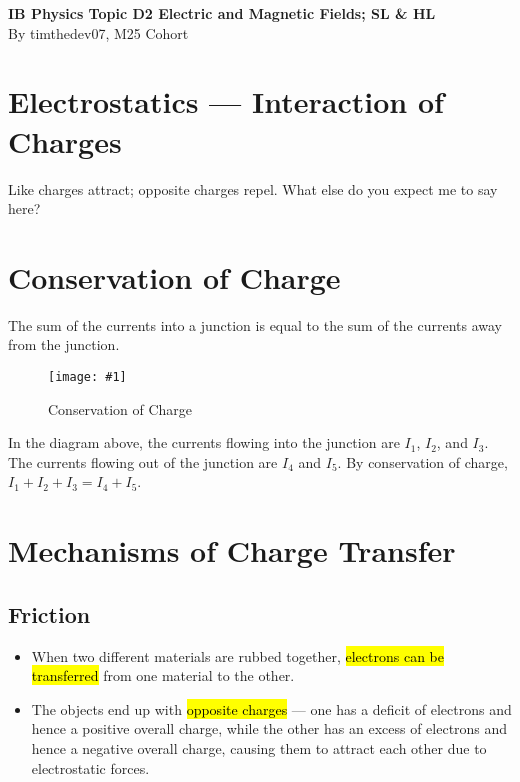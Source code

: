 \documentclass[a4paper,12pt]{article}
\let\oldsection\section
\renewcommand\section{\clearpage\oldsection}
\newcommand{\img}[4]{\begin{center}
  \begin{figure}[H]
    \centering
    \texttt{[image: \#1]}
    \caption{#3}
    \label{fig:#4}
  \end{figure}
\end{center}}
\begin{document}
\pagestyle{fancy}


\begin{titlepage}
  \begin{center}

    \vspace*{8cm}
    \textbf{\Large {IB Physics Topic D2 Electric and Magnetic Fields; SL \& HL}} \\
    \vspace*{1cm}
    \large{By timthedev07, M25 Cohort}


  \end{center}
\end{titlepage}

\pagebreak
\tableofcontents
\pagebreak

\clearpage
\setcounter{page}{1}

\section{Electrostatics --- Interaction of Charges}
Like charges attract; opposite charges repel. What else do you expect me to say here?

\section{Conservation of Charge}

The sum of the currents into a junction is equal to the sum of the currents away from the junction.

\img{chargeconservation.png}{0.5}{Conservation of Charge}{chargeconservation}
In the diagram above, the currents flowing into the junction are $I_1$, $I_2$, and $I_3$. The currents flowing out of the junction are $I_4$ and $I_5$. By conservation of charge, $I_1 + I_2 + I_3 = I_4 + I_5$.

\section{Mechanisms of Charge Transfer}

\subsection{Friction}

\begin{itemize}
  \item When two different materials are rubbed together, \hl{electrons can be transferred} from one material to the other.
  \item The objects end up with \hl{opposite charges} --- one has a deficit of electrons and hence a positive overall charge, while the other has an excess of electrons and hence a negative overall charge, causing them to attract each other due to electrostatic forces.
\end{itemize}
\end{document}
